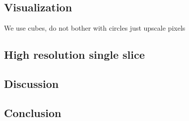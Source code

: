 \subsection{Visualization}
We use cubes, do not bother with circles just upscale pixels

\subsection{High resolution single slice}

\subsection{Discussion}


\subsection{Conclusion}
